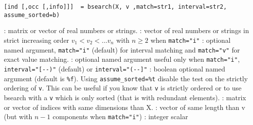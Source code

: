 

\begin{mandesc}
\end{mandesc}

\begin{calling_sequence}
\begin{verbatim}
[ind [,occ [,info]]]  = bsearch(X, v ,match=str1, interval=str2, assume_sorted=b)
\end{verbatim}
\end{calling_sequence}
\begin{parameters}
  \begin{varlist}
    :  matrix or vector of real numbers or strings.
    : vector of real numbers or strings in strict
    increasing order  $v_1 <  v_2 < ... v_n$ with $n \ge 2$ 
    when  \verb+match="i"+
    : optional named argument, \verb+match="i"+
                         (default) for interval matching and
                         \verb+match="v"+ for exact value matching.
    : optional named argument useful only
                           when  \verb+match="i"+, \verb+interval="[--)"+
                         (default) or  \verb+interval="(--]"+
    : boolean optional named argument (default
                              is \verb+%f+). Using \verb+assume_sorted=%t+ disable the test
                              on the strictly ordering of
                              \verb+v+. This can be useful if you know
                              that \verb+v+ is strictly ordered or to
                              use bsearch with a \verb+v+ which is
                              only sorted (that is with redundant elements).  
    : matrix or vector of indices with same dimensions than X.
    : vector of same length than v (but with $n-1$ components 
                  when  \verb+match="i"+)
    : integer scalar
  \end{varlist}
\end{parameters}


